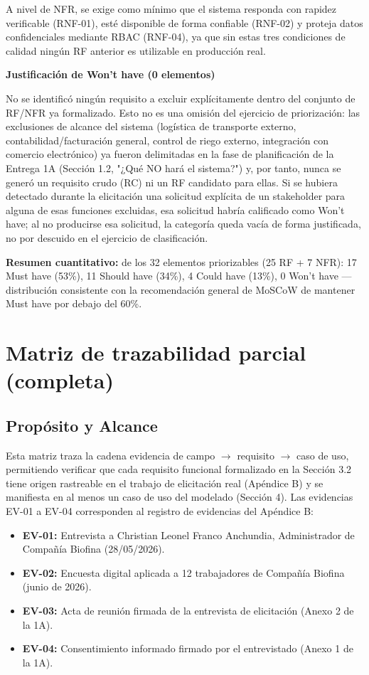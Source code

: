 \documentclass[11pt,a4paper]{article}
\begin{document}
A nivel de NFR, se exige como mínimo que el sistema responda con rapidez verificable (RNF-01), esté disponible de forma confiable (RNF-02) y proteja datos confidenciales mediante RBAC (RNF-04), ya que sin estas tres condiciones de calidad ningún RF anterior es utilizable en producción real.

\textbf{Justificación de Won't have (0 elementos)}

No se identificó ningún requisito a excluir explícitamente dentro del conjunto de RF/NFR ya formalizado. Esto no es una omisión del ejercicio de priorización: las exclusiones de alcance del sistema (logística de transporte externo, contabilidad/facturación general, control de riego externo, integración con comercio electrónico) ya fueron delimitadas en la fase de planificación de la Entrega 1A (Sección 1.2, "¿Qué NO hará el sistema?") y, por tanto, nunca se generó un requisito crudo (RC) ni un RF candidato para ellas. Si se hubiera detectado durante la elicitación una solicitud explícita de un stakeholder para alguna de esas funciones excluidas, esa solicitud habría calificado como Won't have; al no producirse esa solicitud, la categoría queda vacía de forma justificada, no por descuido en el ejercicio de clasificación.

\textbf{Resumen cuantitativo:} de los 32 elementos priorizables (25 RF + 7 NFR): 17 Must have (53\%), 11 Should have (34\%), 4 Could have (13\%), 0 Won't have --- distribución consistente con la recomendación general de MoSCoW de mantener Must have por debajo del 60\%.


\section{Matriz de trazabilidad parcial (completa)}
\subsection{Propósito y Alcance}

Esta matriz traza la cadena evidencia de campo $\rightarrow$ requisito $\rightarrow$ caso de uso, permitiendo verificar que cada requisito funcional formalizado en la Sección 3.2 tiene origen rastreable en el trabajo de elicitación real (Apéndice B) y se manifiesta en al menos un caso de uso del modelado (Sección 4). Las evidencias EV-01 a EV-04 corresponden al registro de evidencias del Apéndice B:

\begin{itemize}
\item \textbf{EV-01:} Entrevista a Christian Leonel Franco Anchundia, Administrador de Compañía Biofina (28/05/2026).
\item \textbf{EV-02:} Encuesta digital aplicada a 12 trabajadores de Compañía Biofina (junio de 2026).
\item \textbf{EV-03:} Acta de reunión firmada de la entrevista de elicitación (Anexo 2 de la 1A).
\item \textbf{EV-04:} Consentimiento informado firmado por el entrevistado (Anexo 1 de la 1A).
\end{itemize}
\end{document}
